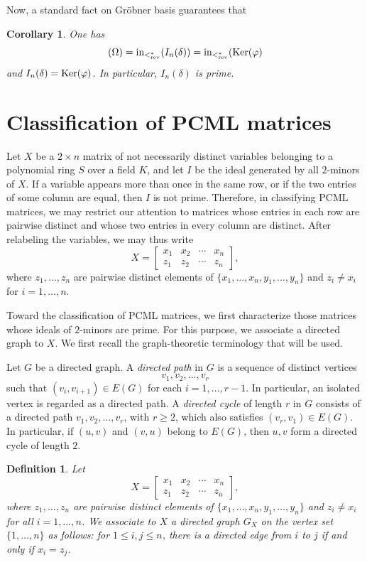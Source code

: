 \documentclass[12pt]{amsart}
\newtheorem{Corollary}[Theorem]{Corollary}
\newtheorem{Definition}[Theorem]{Definition}
\begin{document}
Now, a standard fact on Gr\"obner basis \cite[Proposition 2.2.5]{HHgtm260} guarantees that 

\begin{Corollary}
\label{toric_ideal}
One has $$(\Omega) = {\rm in}_{<_{\rm rev}^*}(I_n(\delta)) = {\rm in}_{<_{\rm rev}^*}({\rm Ker}(\varphi)$$ and $I_n(\delta) = {\rm Ker}(\varphi)$.  In particular, $I_n(\delta)$ is prime.
\end{Corollary}


\section{Classification of PCML matrices}

Let $X$ be a $2\times n$ matrix of not necessarily distinct variables
belonging to a polynomial ring $S$ over a field $K$, and let $I$ be
the ideal generated by all $2$-minors of $X$. If a variable appears more than once in the same row, or if the two
entries of some column are equal, then $I$ is not prime. Therefore,
in classifying PCML matrices, we may restrict our attention to matrices
whose entries in each row are pairwise distinct and whose two entries
in every column are distinct. After relabeling the variables, we may thus write
\[
X=
\begin{bmatrix}
x_1 & x_2 & \cdots & x_n\\
z_1 & z_2 & \cdots & z_n
\end{bmatrix},
\]
where $z_1,\ldots,z_n$ are pairwise distinct elements of
$\{x_1,\ldots,x_n,y_1,\ldots,y_n\}$ and $z_i\neq x_i$ for
$i=1,\ldots,n$.

Toward the classification of PCML matrices, we first characterize those matrices whose ideals of $2$-minors are prime. For this purpose, we associate a directed graph to $X$. We first recall the graph-theoretic terminology that will be used.

Let $G$ be a directed graph. A \emph{directed path} in $G$ is a sequence of distinct vertices \[ v_1,v_2,\ldots,v_r \] such that $(v_i,v_{i+1})\in E(G)$ for each $i=1,\ldots,r-1$. In particular, an isolated vertex is regarded as a directed path. A \emph{directed cycle} of length $r$ in $G$ consists of a directed path
$v_1,v_2,\ldots,v_r$, with $r\geq 2$, which also satisfies
$(v_r,v_1)\in E(G)$. In particular, if $(u,v)$ and
$(v,u)$ belong to $E(G)$, then $u,v$ form a directed cycle of length $2$.

\begin{Definition}
{\em
Let
\[
X=
\begin{bmatrix}
x_1 & x_2 & \cdots & x_n\\
z_1 & z_2 & \cdots & z_n
\end{bmatrix},
\]
where $z_1,\ldots,z_n$ are pairwise distinct elements of
$\{x_1,\ldots,x_n,y_1,\ldots,y_n\}$ and $z_i\neq x_i$ for all
$i=1,\ldots,n$.
%
We associate to $X$ a directed graph $G_X$ on the vertex set
$\{1,\ldots,n\}$ as follows: for $1\le i,j\le n$, there is a directed edge
from $i$ to $j$ if and only if $x_i=z_j$.
}
\end{Definition}
\end{document}
